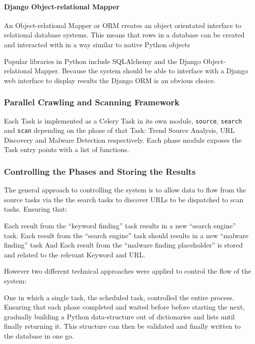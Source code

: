 \paragraph{Django Object-relational Mapper} %
An Object-relational Mapper or ORM creates an object orientated interface to relational database systems.  This means that rows in a database can be created and interacted with in a way similar to native Python objects

Popular libraries in Python include SQLAlchemy and the Django Object-relational Mapper. Because the system should be able to interface with a Django web interface to display results the Django ORM is an obvious choice.

\subsubsection{Parallel Crawling and Scanning Framework}
Each Task is implemented as a Celery Task in its own module, \verb`source`, \verb`search` and \verb`scan` depending on the phase of that Task: Trend Source Analysis, URL Discovery and Malware Detection respectively. Each phase module exposes the Task entry points with a list of functions.

\subsubsection{Controlling the Phases and Storing the Results}
The general approach to controlling the system is to allow data to flow from the source tasks via the the search tasks to discover URLs to be dispatched to scan tasks. Ensuring that:

Each result from the ``keyword finding'' task results in a new ``search engine'' task.
Each result from the ``search engine'' task should results in a new ``malware finding'' task
And Each result from the ``malware finding placeholder'' is stored and related to the relevant Keyword and URL.

However two different technical approaches were applied to control the flow of the system:

One in which a single task, the scheduled task, controlled the entire process.  Ensuring that each phase completed and waited before before starting the next, gradually building a Python data-structure out of dictionaries and lists until finally returning it.  This structure can then be validated and finally written to the database in one go.

